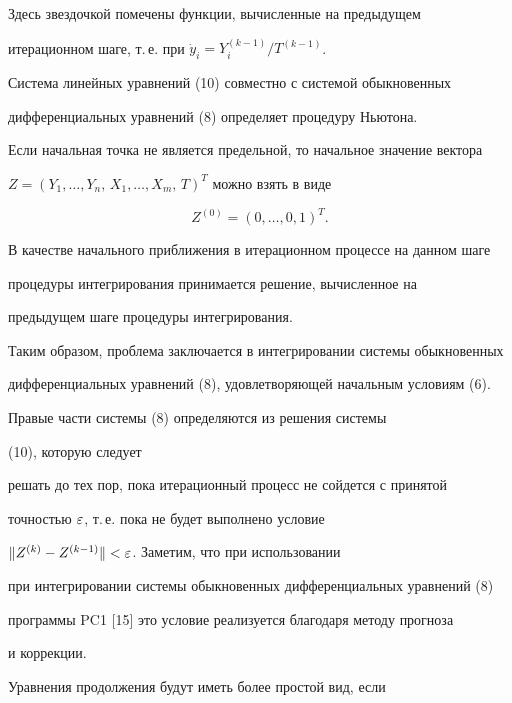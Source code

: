 Здесь звездочкой помечены функции, вычисленные на предыдущем


итерационном шаге, т.\,е. при $\Dot y_i=Y_i^{(k-1)}/T^{(k-1)}$.





Система линейных уравнений (10) совместно с системой обыкновенных


дифференциальных уравнений (8) определяет процедуру Ньютона.


Если начальная точка не является предельной, то начальное значение вектора


$Z=(Y_1,\dotsc,Y_n,\, X_1,\dotsc,X_m,\, T)^T$ можно взять в виде


\begin{equation}


Z^{(0)}=(0,\dotsc ,0, 1)^T.


\end{equation}





В качестве начального приближения в итерационном процессе на данном шаге


процедуры интегрирования принимается решение, вычисленное на


предыдущем шаге процедуры интегрирования.





Таким образом, проблема заключается  в интегрировании системы обыкновенных


дифференциальных уравнений (8), удовлетворяющей начальным условиям (6).


Правые части системы (8) определяются из решения системы


(10), которую следует


решать до тех пор, пока итерационный процесс не сойдется с принятой


точностью $\varepsilon$, т.\,е. пока не будет выполнено условие


$\|Z^{(k)}-Z^{(k-1)}\|<\varepsilon$. Заметим, что при использовании


при интегрировании системы обыкновенных дифференциальных уравнений (8)


программы PC1 [15] это условие реализуется благодаря методу прогноза


и коррекции.





Уравнения продолжения будут иметь более простой вид, если


